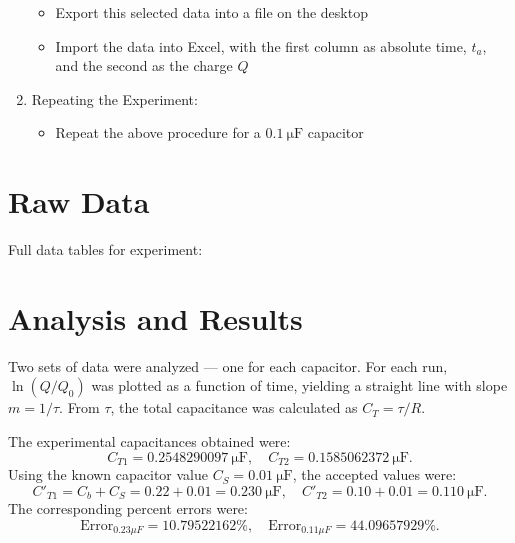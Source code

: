 \documentclass[11pt]{article}
\begin{document}
\begin{enumerate}
\begin{itemize}
        \item Export this selected data into a file on the desktop
        \item Import the data into Excel, with the first column as absolute time, $t_a$, and the second as the charge $Q$
    \end{itemize}
    \item Repeating the Experiment:
    \begin{itemize}
        \item Repeat the above procedure for a $\SI{0.1}{\micro\farad}$ capacitor
    \end{itemize}
\end{enumerate}

\section{Raw Data}
Full data tables for experiment: 

\section{Analysis and Results}
Two sets of data were analyzed — one for each capacitor.
For each run, $\ln(Q/Q_0)$ was plotted as a function of time, yielding a straight line with slope $m=1/\tau$.
From $\tau$, the total capacitance was calculated as $C_T = \tau / R$.

The experimental capacitances obtained were:
\[
C_{T1} = \SI{0.2548290097}{\micro\farad}, \quad
C_{T2} = \SI{0.1585062372}{\micro\farad}.
\]
Using the known capacitor value $C_S = \SI{0.01}{\micro\farad}$, the accepted values were:
\[
C'_{T1} = C_b + C_S = 0.22 + 0.01 = \SI{0.230}{\micro\farad},
\quad
C'_{T2} = 0.10 + 0.01 = \SI{0.110}{\micro\farad}.
\]
The corresponding percent errors were:
\[
\text{Error}_{0.23\mu F} = 10.79522162\%, \quad
\text{Error}_{0.11\mu F} = 44.09657929\%.
\]
\end{document}
